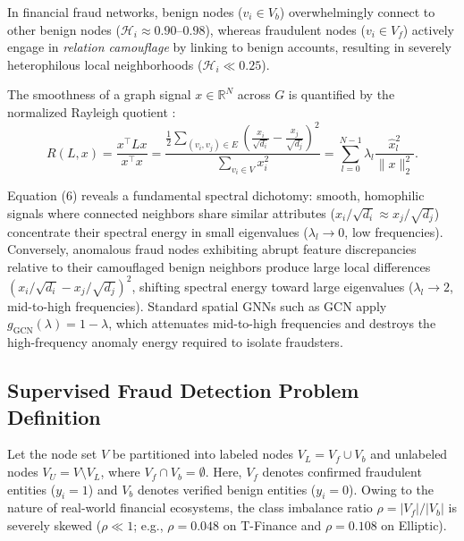 \documentclass[10pt,a4paper,twocolumn]{article}
\begin{document}
In financial fraud networks, benign nodes ($v_i \in V_b$) overwhelmingly connect to other benign nodes ($\mathscr{H}_i \approx 0.90\text{--}0.98$), whereas fraudulent nodes ($v_i \in V_f$) actively engage in \textit{relation camouflage} by linking to benign accounts, resulting in severely heterophilous local neighborhoods ($\mathscr{H}_i \ll 0.25$).

The smoothness of a graph signal $x \in \mathbb{R}^N$ across $G$ is quantified by the normalized Rayleigh quotient \cite{ref32,ref33}:
\begin{equation}
  R(L, x) = \frac{x^\top L x}{x^\top x} = \frac{\frac{1}{2}\sum_{(v_i, v_j) \in E} \left(\frac{x_i}{\sqrt{d_i}} - \frac{x_j}{\sqrt{d_j}}\right)^2}{\sum_{v_i \in V} x_i^2} = \sum_{l=0}^{N-1} \lambda_l \frac{\hat{x}_l^2}{\|x\|_2^2}.
\end{equation}

Equation (6) reveals a fundamental spectral dichotomy: smooth, homophilic signals where connected neighbors share similar attributes ($x_i/\sqrt{d_i} \approx x_j/\sqrt{d_j}$) concentrate their spectral energy in small eigenvalues ($\lambda_l \to 0$, low frequencies). Conversely, anomalous fraud nodes exhibiting abrupt feature discrepancies relative to their camouflaged benign neighbors produce large local differences $(x_i/\sqrt{d_i} - x_j/\sqrt{d_j})^2$, shifting spectral energy toward large eigenvalues ($\lambda_l \to 2$, mid-to-high frequencies). Standard spatial GNNs such as GCN apply $g_{\text{GCN}}(\lambda) = 1 - \lambda$, which attenuates mid-to-high frequencies and destroys the high-frequency anomaly energy required to isolate fraudsters.

\subsection{Supervised Fraud Detection Problem Definition}

Let the node set $V$ be partitioned into labeled nodes $V_L = V_f \cup V_b$ and unlabeled nodes $V_U = V \setminus V_L$, where $V_f \cap V_b = \emptyset$. Here, $V_f$ denotes confirmed fraudulent entities ($y_i = 1$) and $V_b$ denotes verified benign entities ($y_i = 0$). Owing to the nature of real-world financial ecosystems, the class imbalance ratio $\rho = |V_f|/|V_b|$ is severely skewed ($\rho \ll 1$; e.g., $\rho = 0.048$ on T-Finance and $\rho = 0.108$ on Elliptic).
\end{document}
